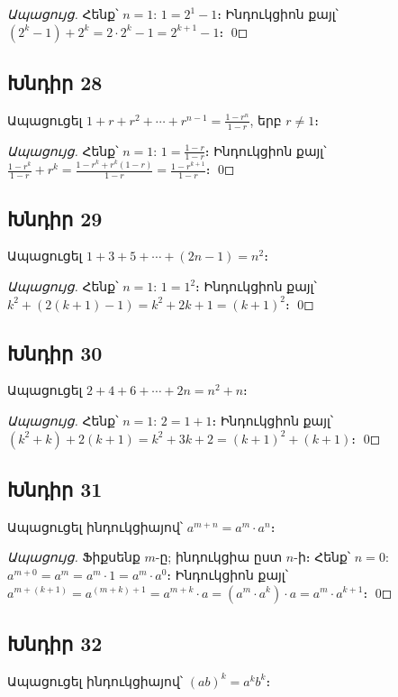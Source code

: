 \textit{Ապացույց.} Հենք՝ $n=1$: $1 = 2^1 - 1$։ Ինդուկցիոն քայլ՝
$(2^k - 1) + 2^k = 2 \cdot 2^k - 1 = 2^{k+1} - 1$։ \qed

\subsection*{Խնդիր 28}
Ապացուցել $1 + r + r^2 + \cdots + r^{n-1} = \frac{1-r^n}{1-r}$, երբ $r \neq 1$։

\textit{Ապացույց.} Հենք՝ $n=1$: $1 = \frac{1-r}{1-r}$։ Ինդուկցիոն քայլ՝
$\frac{1-r^k}{1-r} + r^k = \frac{1-r^k + r^k(1-r)}{1-r} = \frac{1 - r^{k+1}}{1-r}$։ \qed

\subsection*{Խնդիր 29}
Ապացուցել $1 + 3 + 5 + \cdots + (2n-1) = n^2$։

\textit{Ապացույց.} Հենք՝ $n=1$: $1 = 1^2$։ Ինդուկցիոն քայլ՝
$k^2 + (2(k+1)-1) = k^2 + 2k + 1 = (k+1)^2$։ \qed

\subsection*{Խնդիր 30}
Ապացուցել $2 + 4 + 6 + \cdots + 2n = n^2 + n$։

\textit{Ապացույց.} Հենք՝ $n=1$: $2 = 1 + 1$։ Ինդուկցիոն քայլ՝
$(k^2 + k) + 2(k+1) = k^2 + 3k + 2 = (k+1)^2 + (k+1)$։ \qed

\subsection*{Խնդիր 31}
Ապացուցել ինդուկցիայով՝ $a^{m+n} = a^m \cdot a^n$։

\textit{Ապացույց.} Ֆիքսենք $m$-ը; ինդուկցիա ըստ $n$-ի։ Հենք՝ $n=0$: $a^{m+0} = a^m = a^m \cdot 1 = a^m \cdot a^0$։
Ինդուկցիոն քայլ՝ $a^{m+(k+1)} = a^{(m+k)+1} = a^{m+k} \cdot a = (a^m \cdot a^k) \cdot a = a^m \cdot a^{k+1}$։ \qed

\subsection*{Խնդիր 32}
Ապացուցել ինդուկցիայով՝ $(ab)^k = a^k b^k$։

